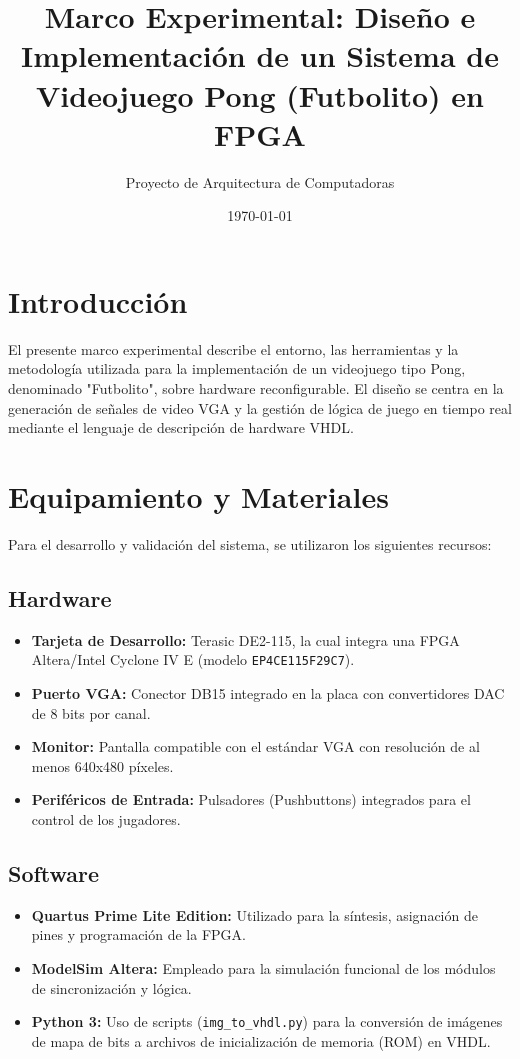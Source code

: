 \documentclass[12pt, a4paper]{article}
\title{Marco Experimental: Diseño e Implementación de un Sistema de Videojuego Pong (Futbolito) en FPGA}
\author{Proyecto de Arquitectura de Computadoras}
\date{\today}
\begin{document}
\maketitle

\section{Introducción}
El presente marco experimental describe el entorno, las herramientas y la metodología utilizada para la implementación de un videojuego tipo Pong, denominado "Futbolito", sobre hardware reconfigurable. El diseño se centra en la generación de señales de video VGA y la gestión de lógica de juego en tiempo real mediante el lenguaje de descripción de hardware VHDL.

\section{Equipamiento y Materiales}
Para el desarrollo y validación del sistema, se utilizaron los siguientes recursos:

\subsection{Hardware}
\begin{itemize}
    \item \textbf{Tarjeta de Desarrollo:} Terasic DE2-115, la cual integra una FPGA Altera/Intel Cyclone IV E (modelo \texttt{EP4CE115F29C7}).
    \item \textbf{Puerto VGA:} Conector DB15 integrado en la placa con convertidores DAC de 8 bits por canal.
    \item \textbf{Monitor:} Pantalla compatible con el estándar VGA con resolución de al menos 640x480 píxeles.
    \item \textbf{Periféricos de Entrada:} Pulsadores (Pushbuttons) integrados para el control de los jugadores.
\end{itemize}

\subsection{Software}
\begin{itemize}
    \item \textbf{Quartus Prime Lite Edition:} Utilizado para la síntesis, asignación de pines y programación de la FPGA.
    \item \textbf{ModelSim Altera:} Empleado para la simulación funcional de los módulos de sincronización y lógica.
    \item \textbf{Python 3:} Uso de scripts (\texttt{img\_to\_vhdl.py}) para la conversión de imágenes de mapa de bits a archivos de inicialización de memoria (ROM) en VHDL.
\end{itemize}
\end{document}

